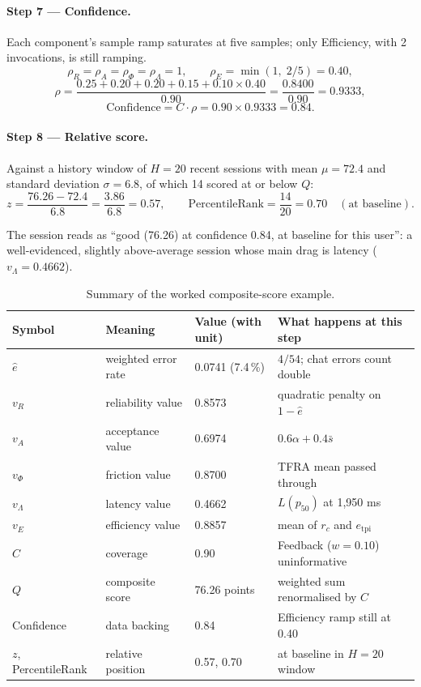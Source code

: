 \documentclass[11pt,a4paper]{article}
\begin{document}
\paragraph{Step 7 --- Confidence.}
Each component's sample ramp saturates at five samples; only Efficiency,
with 2 invocations, is still ramping.
\[
  \rho_R = \rho_A = \rho_\Phi = \rho_\Lambda = 1,
  \qquad
  \rho_E = \min(1,\; 2/5) = 0.40,
\]
\[
  \rho = \frac{0.25 + 0.20 + 0.20 + 0.15 + 0.10 \times 0.40}{0.90}
       = \frac{0.8400}{0.90}
       = 0.9333,
\]
\[
  \text{Confidence} = C \cdot \rho = 0.90 \times 0.9333 = 0.84.
\]

\paragraph{Step 8 --- Relative score.}
Against a history window of $H = 20$ recent sessions with mean
$\mu = 72.4$ and standard deviation $\sigma = 6.8$, of which 14 scored at
or below $Q$:
\[
  z = \frac{76.26 - 72.4}{6.8} = \frac{3.86}{6.8} = 0.57,
  \qquad
  \text{PercentileRank} = \frac{14}{20} = 0.70
  \quad (\text{at baseline}).
\]

The session reads as ``good (76.26) at confidence 0.84, at baseline for
this user'': a well-evidenced, slightly above-average session whose main
drag is latency ($v_\Lambda = 0.4662$).

\begin{table}[h!]
\centering
\caption{Summary of the worked composite-score example.}
\label{tab:quality-engine-worked}
\begin{tabular}{@{}llll@{}}
\toprule
Symbol & Meaning & Value (with unit) & What happens at this step \\
\midrule
$\hat{e}$ & weighted error rate & 0.0741 (7.4\,\%) & $4/54$; chat errors count double \\
$v_R$ & reliability value & 0.8573 & quadratic penalty on $1-\hat{e}$ \\
$v_A$ & acceptance value & 0.6974 & $0.6\alpha + 0.4\bar{s}$ \\
$v_\Phi$ & friction value & 0.8700 & TFRA mean passed through \\
$v_\Lambda$ & latency value & 0.4662 & $L(p_{50})$ at 1{,}950 ms \\
$v_E$ & efficiency value & 0.8857 & mean of $r_c$ and $e_{\mathrm{tpi}}$ \\
$C$ & coverage & 0.90 & Feedback ($w=0.10$) uninformative \\
$Q$ & composite score & 76.26 points & weighted sum renormalised by $C$ \\
Confidence & data backing & 0.84 & Efficiency ramp still at 0.40 \\
$z$, PercentileRank & relative position & 0.57, 0.70 & at baseline in $H=20$ window \\
\bottomrule
\end{tabular}
\end{table}
\end{document}

